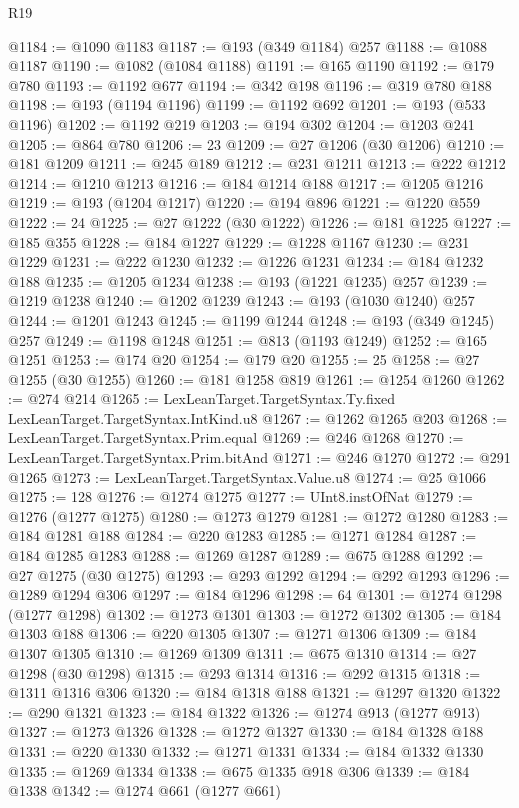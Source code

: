 \begin{lexlean}{R19}
\begin{coremodule}
@1184 := @1090 @1183
@1187 := @193 (@349 @1184) @257
@1188 := @1088 @1187
@1190 := @1082 (@1084 @1188)
@1191 := @165 @1190
@1192 := @179 @780
@1193 := @1192 @677
@1194 := @342 @198
@1196 := @319 @780 @188
@1198 := @193 (@1194 @1196)
@1199 := @1192 @692
@1201 := @193 (@533 @1196)
@1202 := @1192 @219
@1203 := @194 @302
@1204 := @1203 @241
@1205 := @864 @780
@1206 := 23
@1209 := @27 @1206 (@30 @1206)
@1210 := @181 @1209
@1211 := @245 @189
@1212 := @231 @1211
@1213 := @222 @1212
@1214 := @1210 @1213
@1216 := @184 @1214 @188
@1217 := @1205 @1216
@1219 := @193 (@1204 @1217)
@1220 := @194 @896
@1221 := @1220 @559
@1222 := 24
@1225 := @27 @1222 (@30 @1222)
@1226 := @181 @1225
@1227 := @185 @355
@1228 := @184 @1227
@1229 := @1228 @1167
@1230 := @231 @1229
@1231 := @222 @1230
@1232 := @1226 @1231
@1234 := @184 @1232 @188
@1235 := @1205 @1234
@1238 := @193 (@1221 @1235) @257
@1239 := @1219 @1238
@1240 := @1202 @1239
@1243 := @193 (@1030 @1240) @257
@1244 := @1201 @1243
@1245 := @1199 @1244
@1248 := @193 (@349 @1245) @257
@1249 := @1198 @1248
@1251 := @813 (@1193 @1249)
@1252 := @165 @1251
@1253 := @174 @20
@1254 := @179 @20
@1255 := 25
@1258 := @27 @1255 (@30 @1255)
@1260 := @181 @1258 @819
@1261 := @1254 @1260
@1262 := @274 @214
@1265 := LexLeanTarget.TargetSyntax.Ty.fixed LexLeanTarget.TargetSyntax.IntKind.u8
@1267 := @1262 @1265 @203
@1268 := LexLeanTarget.TargetSyntax.Prim.equal
@1269 := @246 @1268
@1270 := LexLeanTarget.TargetSyntax.Prim.bitAnd
@1271 := @246 @1270
@1272 := @291 @1265
@1273 := LexLeanTarget.TargetSyntax.Value.u8
@1274 := @25 @1066
@1275 := 128
@1276 := @1274 @1275
@1277 := UInt8.instOfNat
@1279 := @1276 (@1277 @1275)
@1280 := @1273 @1279
@1281 := @1272 @1280
@1283 := @184 @1281 @188
@1284 := @220 @1283
@1285 := @1271 @1284
@1287 := @184 @1285 @1283
@1288 := @1269 @1287
@1289 := @675 @1288
@1292 := @27 @1275 (@30 @1275)
@1293 := @293 @1292
@1294 := @292 @1293
@1296 := @1289 @1294 @306
@1297 := @184 @1296
@1298 := 64
@1301 := @1274 @1298 (@1277 @1298)
@1302 := @1273 @1301
@1303 := @1272 @1302
@1305 := @184 @1303 @188
@1306 := @220 @1305
@1307 := @1271 @1306
@1309 := @184 @1307 @1305
@1310 := @1269 @1309
@1311 := @675 @1310
@1314 := @27 @1298 (@30 @1298)
@1315 := @293 @1314
@1316 := @292 @1315
@1318 := @1311 @1316 @306
@1320 := @184 @1318 @188
@1321 := @1297 @1320
@1322 := @290 @1321
@1323 := @184 @1322
@1326 := @1274 @913 (@1277 @913)
@1327 := @1273 @1326
@1328 := @1272 @1327
@1330 := @184 @1328 @188
@1331 := @220 @1330
@1332 := @1271 @1331
@1334 := @184 @1332 @1330
@1335 := @1269 @1334
@1338 := @675 @1335 @918 @306
@1339 := @184 @1338
@1342 := @1274 @661 (@1277 @661)

\end{coremodule}
\end{lexlean}
